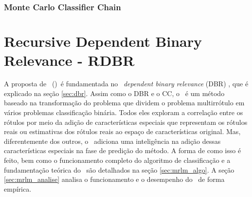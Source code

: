 \subsection{Monte Carlo Classifier Chain}
\cite{mcc2012}



\chapter{Recursive Dependent Binary Relevance - RDBR}
A proposta de \MRLM~(\MRLMa)~é fundamentada no \MML~\textit{dependent binary relevance} (DBR) \cite{dbr2014}, que é explicado
na seção \ref{sec:dbr}. Assim como o DBR e o CC, o \MRLMa~é um método baseado na transformação do problema que dividem o problema
multirrótulo em vários problemas classificação binária. Todos eles exploram a correlação entre os rótulos por meio da adição de
características especiais que representam os rótulos reais ou estimativas dos rótulos reais ao espaço de características original. 
Mas, diferentemente dos outros, o \MRLMa~adiciona uma inteligência na adição dessas características especiais na fase de predição do método.
A forma de como isso é feito, bem como o funcionamento completo do algoritmo de classificação e a fundamentação teórica
do \MRLMa~são detalhados na seção \ref{sec:mrlm_algo}. 
A seção \ref{sec:mrlm_analise} analisa o funcionamento e o desempenho do \MRLMa~de forma empírica.


